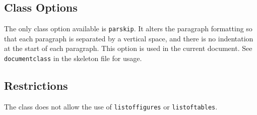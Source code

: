 \subsection{Class Options}

The only class option available is {\tt parskip}.
It alters the paragraph formatting so that each paragraph is separated by
a vertical space, and there is no indentation at the start of each
paragraph. 
This option is used in the current document.
See {\tt documentclass} in the skeleton file for usage. 

\subsection{Restrictions}

The class does not allow the use of {\tt listoffigures} or {\tt listoftables}.